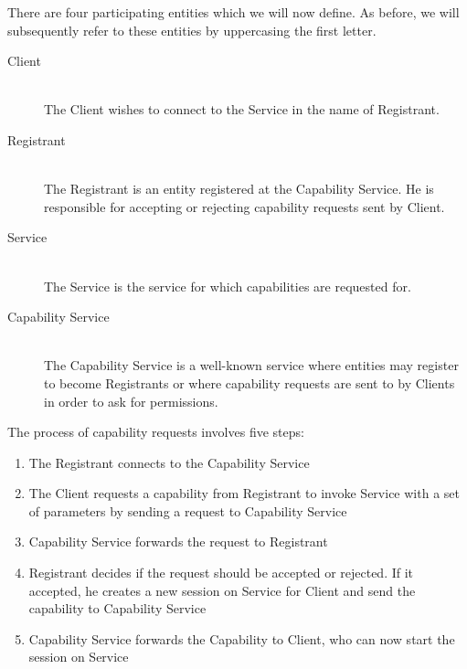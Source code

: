 There are four participating entities which we will now define.
As before, we will subsequently refer to these entities by uppercasing the first letter.
\begin{description}
    \item[Client]\hfill\\
        The Client wishes to connect to the Service in the name of Registrant.
    \item[Registrant]\hfill\\
        The Registrant is an entity registered at the Capability Service.
        He is responsible for accepting or rejecting capability requests sent by Client.
    \item[Service]\hfill\\
        The Service is the service for which capabilities are requested for.
    \item[Capability Service]\hfill\\
        The Capability Service is a well-known service where entities may register to become Registrants or where capability requests are sent to by Clients in order to ask for permissions.
\end{description}

The process of capability requests involves five steps:
\begin{enumerate}
    \item The Registrant connects to the Capability Service
    \item The Client requests a capability from Registrant to invoke Service with a set of parameters by sending a request to Capability Service
    \item Capability Service forwards the request to Registrant
    \item Registrant decides if the request should be accepted or rejected.
        If it accepted, he creates a new session on Service for Client and send the capability to Capability Service
    \item Capability Service forwards the Capability to Client, who can now start the session on Service
\end{enumerate}

